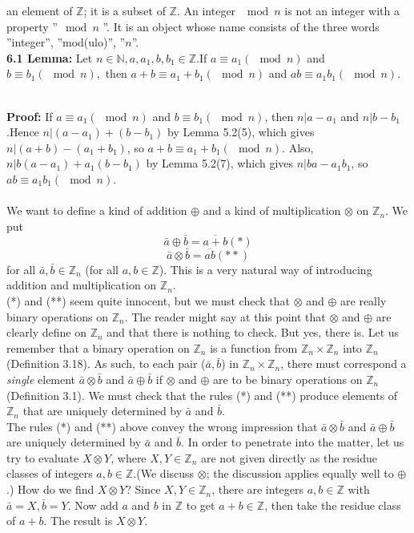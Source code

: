 \documentclass[12pt,a4 paper]{article}
\begin{document}
    an element of $\mathbb{Z}$; it is a subset of $\mathbb{Z}$. An integer $\mod n$ is not an integer with a property  \quad''$\mod n$ ''. It is an object whose name consists of the three words ''integer'', ''mod(ulo)'', ''$n$''.\\
    \textbf{6.1 Lemma:} Let $n \in \mathbb{N},a,a_1,b,b_1 \in \mathbb{Z}$.If $a \equiv a_1(\mod n)$ and $b\equiv b_1 (\mod n),$ then $a+b \equiv a_1 + b_1 (\mod n)$ and $ab \equiv a_1 b_1 (\mod n)$.\par\\
    \textbf{Proof:} If  $a\equiv a_1 (\mod n)$ and $b\equiv b_1 (\mod n)$, then $n|a-a_1$ and $n|b-b_1$.Hence $n|(a-a_1)+(b-b_1)$ by Lemma 5.2(5), which gives $n|(a+b)-(a_1+b_1)$, so $a+b\equiv a_1+b_1 (\mod n)$. Also, $n | b(a-a_1) + a_1(b-b_1)$ by Lemma 5.2(7), which gives $n|ba-a_1 b_1$, so $ab\equiv a_1 b_1(\mod n)$.\\
    \\We want to define a kind of addition $\oplus$ and a kind of multiplication $\otimes$ on $\mathbb{Z}_n$. We put 
        $$\bar{a}\oplus \bar{b}= \overline{a+b} (*)$$
        $$\bar{a}\otimes \bar{b}=\overline{ab} (**)$$
    for all $\bar{a},\bar{b}\in \mathbb{Z}_n$ (for all $a,b\in \mathbb{Z}$). This is a very natural way of introducing addition and multiplication on $\mathbb{Z}_n$.\\
    
    (*) and (**) seem quite innocent, but we must check that $\otimes $ and $\oplus$ are really binary operations on $\mathbb{Z}_n$. The reader might say at this point that $\otimes$ and $\oplus$ are clearly define on $\mathbb{Z}_n$ and that there is nothing to check. But yes, there is. Let us remember that a binary operation on $\mathbb{Z}_n$ is a function from $\mathbb{Z}_n \times \mathbb{Z}_n$ into $\mathbb{Z}_n$ (Definition 3.18). As such, to each pair ($\bar{a},\bar{b}$) in $\mathbb{Z}_n\times \mathbb{Z}_n$, there must correspond a \textit{single} element $\bar{a}\otimes \bar{b}$ and $\bar{a} \oplus \bar{b}$ if $\otimes$ and $\oplus$ are to be binary operations on $\mathbb{Z}_n$ (Definition 3.1). We must check that the rules (*) and (**) produce elements of $\mathbb{Z}_n$ that are uniquely determined by $\bar{a}$ and $\bar{b}$.\\
    
    The rules (*) and (**) above convey the wrong impression that $\bar{a} \otimes \bar{b}$ and $\bar{a} \oplus \bar{b}$ are uniquely determined by $\bar{a}$ and $\bar{b}$. In order to penetrate into the matter, let us try to evaluate $X \otimes Y$, where $X,Y\in \mathbb{Z}_n$ are not given directly as the residue classes of integers $a,b\in \mathbb{Z}$.(We discuss $\otimes$; the discussion applies equally well to $\oplus$.) How do we find $X \otimes Y$? Since $X,Y \in \mathbb{Z}_n$, there are integers $a,b\in \mathbb{Z}$ with $\bar{a}=X,\bar{b}=Y$. Now add $a$ and $b$ in $\mathbb{Z}$ to get $a+b \in \mathbb{Z}$, then take the residue class of $a+b$. The result is $X \otimes Y$.
\end{document}
